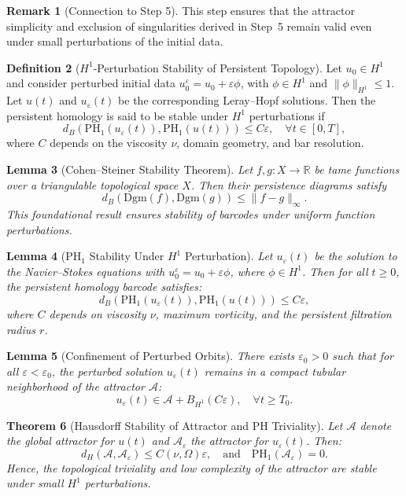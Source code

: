 \documentclass[11pt]{article}
\newtheorem{theorem}{Theorem}[section]
\newtheorem{lemma}[theorem]{Lemma}
\theoremstyle{definition}
\newtheorem{definition}[theorem]{Definition}
\newtheorem{remark}[theorem]{Remark}
\begin{document}
\begin{remark}[Connection to Step 5]
This step ensures that the attractor simplicity and exclusion of singularities derived in Step~5 remain valid even under small perturbations of the initial data.
\end{remark}

\begin{definition}[$H^1$-Perturbation Stability of Persistent Topology]
Let $u_0 \in H^1$ and consider perturbed initial data $u_0^\varepsilon = u_0 + \varepsilon \phi$, with $\phi \in H^1$ and $\|\phi\|_{H^1} \le 1$. Let $u(t)$ and $u_\varepsilon(t)$ be the corresponding Leray--Hopf solutions. Then the persistent homology is said to be stable under $H^1$ perturbations if
\[
d_B(\mathrm{PH}_1(u_\varepsilon(t)), \mathrm{PH}_1(u(t))) \le C \varepsilon, \quad \forall t \in [0, T],
\]
where $C$ depends on the viscosity $\nu$, domain geometry, and bar resolution.
\end{definition}

\begin{lemma}[Cohen--Steiner Stability Theorem]
Let $f, g : X \to \mathbb{R}$ be tame functions over a triangulable topological space $X$. Then their persistence diagrams satisfy
\[
d_B(\mathrm{Dgm}(f), \mathrm{Dgm}(g)) \le \|f - g\|_\infty.
\]
This foundational result ensures stability of barcodes under uniform function perturbations.
\end{lemma}

\begin{lemma}[PH$_1$ Stability Under $H^1$ Perturbation]
Let $u_\varepsilon(t)$ be the solution to the Navier--Stokes equations with $u_0^\varepsilon = u_0 + \varepsilon \phi$, where $\phi \in H^1$. Then for all $t \ge 0$, the persistent homology barcode satisfies:
\[
d_B(\mathrm{PH}_1(u_\varepsilon(t)), \mathrm{PH}_1(u(t))) \le C \varepsilon,
\]
where $C$ depends on viscosity $\nu$, maximum vorticity, and the persistent filtration radius $r$.
\end{lemma}

\begin{lemma}[Confinement of Perturbed Orbits]
There exists $\varepsilon_0 > 0$ such that for all $\varepsilon < \varepsilon_0$, the perturbed solution $u_\varepsilon(t)$ remains in a compact tubular neighborhood of the attractor $\mathcal{A}$:
\[
u_\varepsilon(t) \in \mathcal{A} + B_{H^1}(C\varepsilon), \quad \forall t \ge T_0.
\]
\end{lemma}

\begin{theorem}[Hausdorff Stability of Attractor and PH Triviality]
\label{thm:attractor_stability}
Let $\mathcal{A}$ denote the global attractor for $u(t)$ and $\mathcal{A}_\varepsilon$ the attractor for $u_\varepsilon(t)$. Then:
\[
d_H(\mathcal{A}, \mathcal{A}_\varepsilon) \le C(\nu, \Omega)\varepsilon, \quad \text{and} \quad \mathrm{PH}_1(\mathcal{A}_\varepsilon) = 0.
\]
Hence, the topological triviality and low complexity of the attractor are stable under small $H^1$ perturbations.
\end{theorem}
\end{document}
